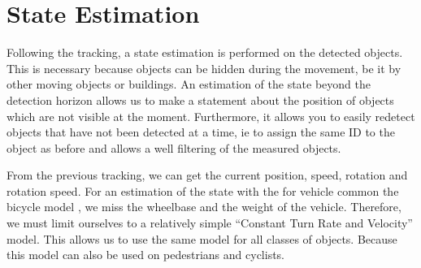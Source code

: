 \documentclass[11pt,oneside,openright]{mpreport}
\begin{document}
%     
%   


\section{State Estimation}

Following the tracking, a state estimation is performed on the detected objects. This is necessary because objects can be hidden during the movement,
be it by other moving objects or buildings. An estimation of the state beyond the detection horizon allows us to make a statement about the position of 
objects which are not visible at the moment. Furthermore, it allows you to easily redetect objects that have not been detected at a time, ie to assign the same ID to the object as before
and allows a well filtering of the measured objects.


From the previous tracking, we can get the current position, speed, rotation and rotation speed. For an estimation of the state with the for vehicle common the bicycle model \cite{althoff2014online,snider2009automatic,kong2015kinematic}, 
we miss the wheelbase and the weight of the vehicle. Therefore, we must limit ourselves to a relatively simple ``Constant Turn Rate and Velocity'' model.
This allows us to use the same model for all classes of objects. Because this model can also be used on pedestrians and cyclists.
\end{document}
